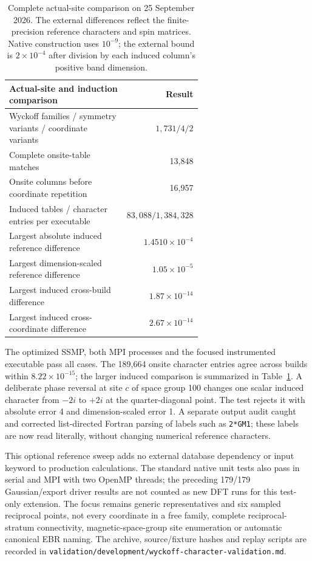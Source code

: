 \documentclass[11pt]{article}
\begin{document}
\begin{table}[htbp]
\centering\small
\begin{tabular}{p{0.63\linewidth}r}
\toprule
Actual-site and induction comparison & Result\\
\midrule
Wyckoff families / symmetry variants / coordinate variants & $1,731/4/2$\\
Complete onsite-table matches & 13,848\\
Onsite columns before coordinate repetition & 16,957\\
Induced tables / character entries per executable & $83,088/1,384,328$\\
Largest absolute induced reference difference & $1.4510\times10^{-4}$\\
Largest dimension-scaled reference difference & $1.05\times10^{-5}$\\
Largest induced cross-build difference & $1.87\times10^{-14}$\\
Largest induced cross-coordinate difference & $2.67\times10^{-14}$\\
\bottomrule
\end{tabular}
\caption{Complete actual-site comparison on 25 September 2026.
The external differences reflect the finite-precision reference
characters and spin matrices. Native construction uses $10^{-9}$;
the external bound is $2\times10^{-4}$ after division by each
induced column's positive band dimension.}
\label{tab:wyckoff-induction}
\end{table}

The optimized SSMP, both MPI processes and the focused instrumented
executable pass all cases. The 189,664 onsite character entries agree
across builds within $8.22\times10^{-15}$; the larger induced
comparison is summarized in Table~\ref{tab:wyckoff-induction}.
A deliberate phase reversal at site $c$ of space group 100 changes
one scalar induced character from $-2i$ to $+2i$ at the quarter-diagonal
point. The test rejects it with absolute error 4 and dimension-scaled
error 1. A separate output audit caught and corrected list-directed
Fortran parsing of labels such as \texttt{2*GM1}; these labels are now
read literally, without changing numerical reference characters.

This optional reference sweep adds no external database dependency
or input keyword to production calculations. The standard native
unit tests also pass in serial and MPI with two OpenMP threads;
the preceding 179/179 Gaussian/export driver results are not counted
as new DFT runs for this test-only extension. The focus remains
generic representatives and six sampled reciprocal points, not
every coordinate in a free family, complete reciprocal-stratum
connectivity, magnetic-space-group site enumeration or automatic
canonical EBR naming. The archive, source/fixture hashes and replay
scripts are recorded in
\texttt{validation/development/wyckoff-character-validation.md}.
\end{document}
